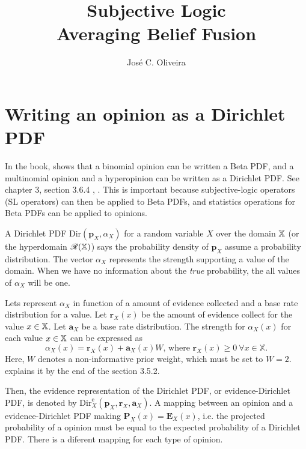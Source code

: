 \documentclass[a4paper,12pt]{article}
\title{Subjective Logic\\
\large{Averaging Belief Fusion}}
\author{José C. Oliveira}
\theoremstyle{definition}
\theoremstyle{theorem}
\numberwithin{equation}{section}
\begin{document}
\maketitle

\section{Writing an opinion as a Dirichlet PDF}

In the book, \citeauthor{josang2016subjective} shows that a binomial opinion can be written a Beta PDF, and a multinomial opinion and a hyperopinion can be written as a Dirichlet PDF. See chapter 3, section 3.6.4 \cite{josang2016subjective}, . This is important because subjective-logic operators (SL operators) can then be applied to Beta PDFs, and statistics operations for Beta PDFs can be applied to opinions.

A Dirichlet PDF $\mathrm{Dir}(\mathbf{p}_X, \alpha_X)$ for a random variable $X$ over the domain $\mathbb{X}$ (or the hyperdomain $\mathcal{R}(\mathbb{X})$) says the probability density of $\mathbf{p}_X$ assume a probability distribution. The vector $\alpha_X$ represents the strength supporting a value of the domain. When we have no information about the \emph{true} probability, the all values of $\alpha_X$ will be one.

Lets represent $\alpha_X$ in function of a amount of evidence collected and a base rate distribution for a value. Let $\mathbf{r}_X(x)$ be the amount of evidence collect for the value $x \in \mathbb{X}$. Let $\mathbf{a}_X$ be a base rate distribution. The strength for $\alpha_X(x)$ for each value $x \in \mathbb{X}$ can be expressed as
\begin{equation}\label{eq:alpha_as_evidence_and_base_rate}
    \alpha_X(x) = \mathbf{r}_X(x) + \mathbf{a}_X(x)W\text{, where }\mathbf{r}_X(x) \geq 0\ \forall x \in \mathbb{X}\text{.}
\end{equation}
Here, $W$ denotes a non-informative prior weight, which must be set to $W = 2$. \citeauthor{josang2016subjective} explains it by the end of the section 3.5.2.

Then, the evidence representation of the Dirichlet PDF, or evidence-Dirichlet PDF, is denoted by $\mathrm{Dir}^{\mathrm{e}}_X(\mathbf{p}_X, \mathbf{r}_X, \mathbf{a}_X)$. A mapping between an opinion and a evidence-Dirichlet PDF making $\mathbf{P}_X(x) = \mathbf{E}_X(x)$, i.e. the projected probability of a opinion must be equal to the expected probability of a Dirichlet PDF. There is a diferent mapping for each type of opinion.
\end{document}
